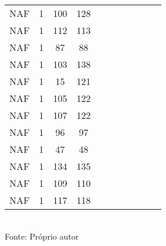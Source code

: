 \begin{table}[H]
{\begin{tabular}{ccccccccccc}
NAF & 1 & 100 & 128 &  &  &  &  &  &  &  \\
NAF & 1 & 112 & 113 &  &  &  &  &  &  &  \\
NAF & 1 & 87 & 88 &  &  &  &  &  &  &  \\
NAF & 1 & 103 & 138 &  &  &  &  &  &  &  \\
NAF & 1 & 15 & 121 &  &  &  &  &  &  &  \\
NAF & 1 & 105 & 122 &  &  &  &  &  &  &  \\
NAF & 1 & 107 & 122 &  &  &  &  &  &  &  \\
NAF & 1 & 96 & 97 &  &  &  &  &  &  &  \\
NAF & 1 & 47 & 48 &  &  &  &  &  &  &  \\
NAF & 1 & 134 & 135 &  &  &  &  &  &  &  \\
NAF & 1 & 109 & 110 &  &  &  &  &  &  &  \\
NAF & 1 & 117 & 118 &  &  &  &  &  &  &  \\
\bottomrule
\end{tabular}}
\\Fonte: Próprio autor
\end{table}


